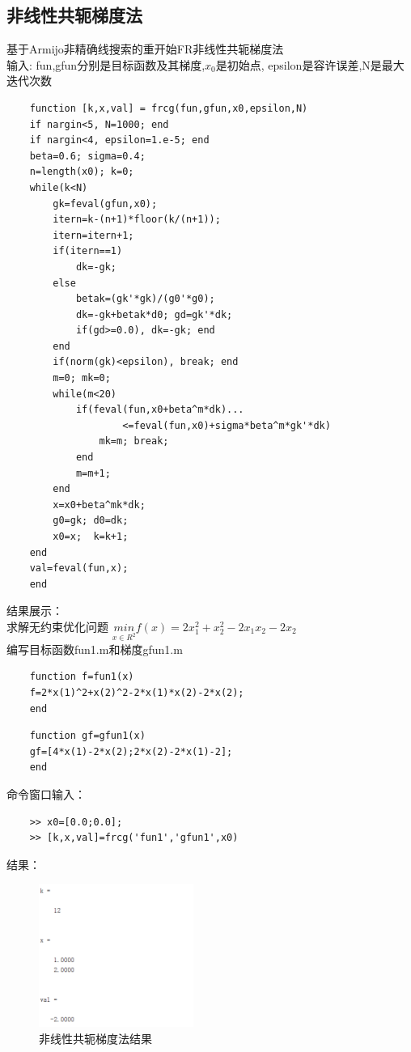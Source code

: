 \documentclass[12pt]{article} %
\begin{document}
	\subsection{非线性共轭梯度法}
	\indent 基于Armijo非精确线搜索的重开始FR非线性共轭梯度法\\
	\indent 输入: fun,gfun分别是目标函数及其梯度,$x_0$是初始点,
	epsilon是容许误差,N是最大迭代次数\\
	\begin{lstlisting}
	function [k,x,val] = frcg(fun,gfun,x0,epsilon,N)
	if nargin<5, N=1000; end
	if nargin<4, epsilon=1.e-5; end
	beta=0.6; sigma=0.4;
	n=length(x0); k=0;
	while(k<N)
		gk=feval(gfun,x0); 
		itern=k-(n+1)*floor(k/(n+1));
		itern=itern+1;
		if(itern==1)
			dk=-gk;
		else
			betak=(gk'*gk)/(g0'*g0);
			dk=-gk+betak*d0; gd=gk'*dk;
			if(gd>=0.0), dk=-gk; end
		end
		if(norm(gk)<epsilon), break; end
		m=0; mk=0;
		while(m<20) 
			if(feval(fun,x0+beta^m*dk)...
					<=feval(fun,x0)+sigma*beta^m*gk'*dk)
				mk=m; break;
			end
			m=m+1;
		end
		x=x0+beta^mk*dk;
		g0=gk; d0=dk;
		x0=x;  k=k+1;
	end
	val=feval(fun,x);
	end
	\end{lstlisting}
	结果展示：\\
	\indent 求解无约束优化问题 $\underset{x\in R^2}{min} f(x)=2x_1^2+x_2^2-2x_1x_2-2x_2$\\
	\indent 编写目标函数fun1.m和梯度gfun1.m
	\begin{lstlisting}
	function f=fun1(x)
	f=2*x(1)^2+x(2)^2-2*x(1)*x(2)-2*x(2);
	end
	\end{lstlisting}
	\begin{lstlisting}
	function gf=gfun1(x)
	gf=[4*x(1)-2*x(2);2*x(2)-2*x(1)-2];
	end
	\end{lstlisting}
	\indent 命令窗口输入：
	\begin{lstlisting}
	>> x0=[0.0;0.0];
	>> [k,x,val]=frcg('fun1','gfun1',x0)
	\end{lstlisting}
	\indent 结果：
	\begin{figure}[ht]
		\centering
		\includegraphics[width=0.45\textwidth]{fxxge.png}
		\caption{非线性共轭梯度法结果}
		\label{fig:fig1}
	\end{figure}
\end{document}

